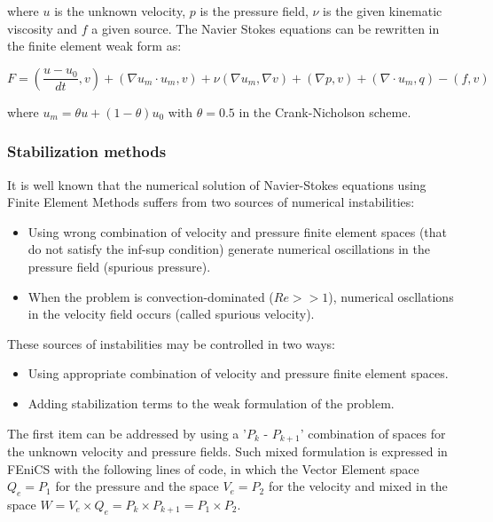 \documentclass[12pt, letterpaper]{article}
\begin{document}
\noindent where $u$ is the unknown velocity, $p$ is the pressure field, $\nu$ is the given kinematic viscosity and $f$ a given source. The Navier Stokes equations can be rewritten in the finite element weak form as:

\begin{equation}
	F = \left(\frac{u - u_0}{dt}, v \right) + \left(\nabla u_m \cdot u_m, v \right) + \nu \left(\nabla u_m, \nabla v \right) + \left(\nabla p, v \right) + \left(\nabla \cdot u_m, q \right) - \left(f,v \right)
\end{equation}

\noindent where $u_m = \theta u + (1-\theta) u_0$ with $\theta = 0.5$ in the Crank-Nicholson scheme.

\subsubsection{Stabilization methods}

It is well known that the numerical solution of Navier-Stokes equations using Finite Element Methods suffers from two sources of numerical instabilities\cite{tezduyar}\cite{tezduyar2}:

\begin{itemize}
	\item Using wrong combination of velocity and pressure finite element spaces (that do not satisfy the inf-sup condition) generate numerical oscillations in the pressure field (spurious pressure).
	\item When the problem is convection-dominated ($Re >> 1$), numerical oscllations in the velocity field occurs (called spurious velocity).
\end{itemize}

These sources of instabilities may be controlled in two ways:

\begin{itemize}
	\item Using appropriate combination of velocity and pressure finite element spaces.
	\item Adding stabilization terms to the weak formulation of the problem.
\end{itemize}

The first item can be addressed by using a '$P_k$ - $P_{k+1}$' combination of spaces for the unknown velocity and pressure fields.
Such mixed formulation is expressed in FEniCS with the following lines of code, in which the Vector Element space $Q_e = P_1$ for the pressure and the space $V_e = P_2$ for the velocity and mixed in the space $W = {V_e}\times{Q_e} = {P_k}\times{P_{k+1}} = {P_1}\times{P_2}$.
\end{document}
